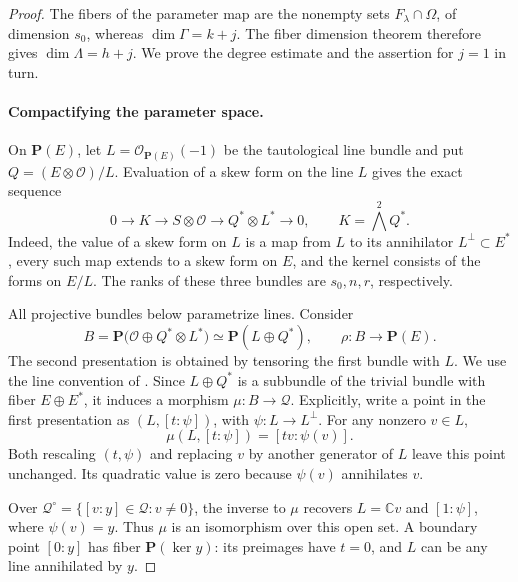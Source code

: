 \begin{proof}
The fibers of the parameter map are the nonempty sets
\(F_\lambda\cap\Omega\), of dimension \(s_0\), whereas
\(\dim\Gamma=k+j\).  The fiber dimension theorem therefore gives
\(\dim\Lambda=h+j\).  We prove the degree estimate and the
assertion for \(j=1\) in turn.

\paragraph{Compactifying the parameter space.}
On \(\mathbf{P}(E)\), let \(L=\mathcal O_{\mathbf{P}(E)}(-1)\)
be the tautological line bundle and put
\(Q=(E\otimes\mathcal O)/L\).  Evaluation of a skew form on
the line \(L\) gives the exact sequence
\begin{equation}
 0\longrightarrow K\longrightarrow S\otimes\mathcal O
 \longrightarrow Q^*\otimes L^*\longrightarrow0,
 \qquad K=\bigwedge^2 Q^*.
 \label{conc:deg-evaluation}
\end{equation}
Indeed, the value of a skew form on \(L\) is a map from \(L\)
to its annihilator \(L^\perp\subset E^*\), every such map
extends to a skew form on \(E\), and the kernel consists of the
forms on \(E/L\).  The ranks of these three bundles are
\(s_0,n,r\), respectively.

All projective bundles below parametrize lines.  Consider
\begin{equation}
 B=\mathbf{P}\bigl(\mathcal O\oplus Q^*\otimes L^*\bigr)
   \simeq\mathbf{P}(L\oplus Q^*),
 \qquad \rho:B\longrightarrow\mathbf{P}(E).
 \label{conc:deg-parameter-bundle}
\end{equation}
The second presentation is obtained by tensoring the first bundle
with \(L\).  We use the line convention of
\cite[Section~3.1 and Example~3.1.1]{fulton1998}.  Since \(L\oplus Q^*\)
is a subbundle of the trivial bundle with fiber \(E\oplus E^*\),
it induces a morphism \(\mu:B\to\mathcal Q\).  Explicitly,
write a point in the first presentation as \((L,[t:\psi])\),
with \(\psi:L\to L^\perp\).  For any nonzero \(v\in L\),
\begin{equation}
 \mu(L,[t:\psi])=[tv:\psi(v)].
 \label{conc:deg-parameter-map}
\end{equation}
Both rescaling \((t,\psi)\) and replacing \(v\) by another
generator of \(L\) leave this point unchanged.  Its quadratic
value is zero because \(\psi(v)\) annihilates \(v\).

Over \(\mathcal Q^\circ=\{[v:y]\in\mathcal Q:v\ne0\}\),
the inverse to \(\mu\) recovers \(L=\mathbb{C}v\) and
\([1:\psi]\), where \(\psi(v)=y\).  Thus \(\mu\) is an
isomorphism over this open set.  A boundary point \([0:y]\)
has fiber \(\mathbf{P}(\ker y)\): its preimages have \(t=0\),
and \(L\) can be any line annihilated by \(y\).


\end{proof}
